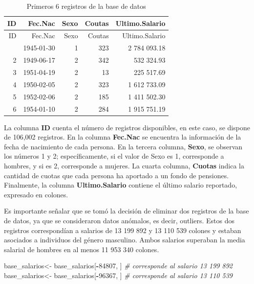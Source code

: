 \documentclass[
]{article}
\newenvironment{Shaded}{\begin{snugshade}}{\end{snugshade}}
\newcommand{\CommentTok}[1]{\textcolor[rgb]{0.56,0.35,0.01}{\textit{#1}}}
\newcommand{\DecValTok}[1]{\textcolor[rgb]{0.00,0.00,0.81}{#1}}
\newcommand{\NormalTok}[1]{#1}
\newcommand{\OtherTok}[1]{\textcolor[rgb]{0.56,0.35,0.01}{#1}}
\newcommand{\SpecialCharTok}[1]{\textcolor[rgb]{0.81,0.36,0.00}{\textbf{#1}}}
\begin{document}
\begin{longtable}[]{@{}rrrrr@{}}
\caption{Primeros 6 registros de la base de datos}\tabularnewline
\toprule\noalign{}
ID & Fec.Nac & Sexo & Coutas & Ultimo.Salario \\
\midrule\noalign{}
\endfirsthead
\toprule\noalign{}
ID & Fec.Nac & Sexo & Coutas & Ultimo.Salario \\
\midrule\noalign{}
\endhead
\bottomrule\noalign{}
\endlastfoot
1 & 1945-01-30 & 1 & 323 & 2 784 093.18 \\
2 & 1949-06-17 & 2 & 342 & 532 324.93 \\
3 & 1951-04-19 & 2 & 13 & 225 517.69 \\
4 & 1950-02-05 & 2 & 323 & 1 612 733.09 \\
5 & 1952-02-06 & 2 & 185 & 1 411 502.30 \\
6 & 1954-01-10 & 2 & 284 & 1 915 751.19 \\
\end{longtable}

La columna \textbf{ID} cuenta el número de registros disponibles, en
este caso, se dispone de 106,002 registros. En la columna
\textbf{Fec.Nac} se encuentra la información de la fecha de nacimiento
de cada persona. En la tercera columna, \textbf{Sexo}, se observan los
números 1 y 2; específicamente, si el valor de Sexo es 1, corresponde a
hombres, y si es 2, corresponde a mujeres. La cuarta columna,
\textbf{Cuotas} indica la cantidad de cuotas que cada persona ha
aportado a un fondo de pensiones. Finalmente, la columna
\textbf{Ultimo.Salario} contiene el último salario reportado, expresado
en colones.

Es importante señalar que se tomó la decisión de eliminar dos registros
de la base de datos, ya que se consideraron datos anómalos, es decir,
outliers. Estos dos registros correspondían a salarios de 13 199 892 y
13 110 539 colones y estaban asociados a individuos del género
masculino. Ambos salarios superaban la media salarial de hombres en al
menos 11 953 340 colones.

\begin{Shaded}
\begin{Highlighting}[]
\NormalTok{base\_salarios}\OtherTok{\textless{}{-}}\NormalTok{ base\_salarios[}\SpecialCharTok{{-}}\DecValTok{84807}\NormalTok{, ] }\CommentTok{\# corresponde al salario 13 199 892}
\NormalTok{base\_salarios}\OtherTok{\textless{}{-}}\NormalTok{ base\_salarios[}\SpecialCharTok{{-}}\DecValTok{96367}\NormalTok{, ] }\CommentTok{\# corresponde al salario 13 110 539}
\end{Highlighting}
\end{Shaded}
\end{document}
